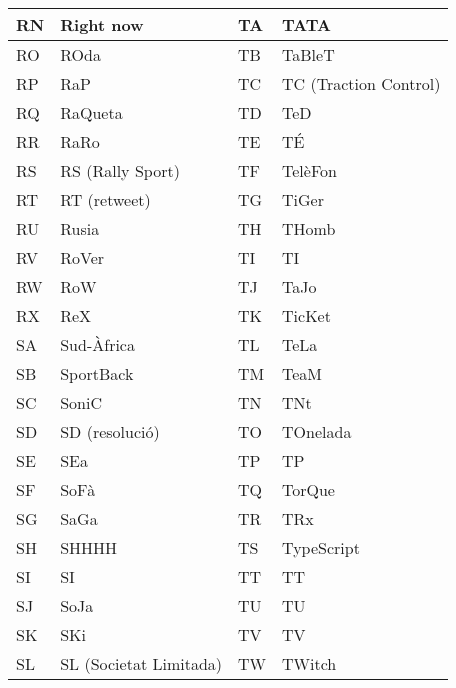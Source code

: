 \begin{table}[!ht]
    \centering
    \begin{tabular}{|l|l|l|l|}
    \hline
    RN & Right now              & TA & TATA                  \\ \hline
    RO & ROda                   & TB & TaBleT                \\ \hline
    RP & RaP                    & TC & TC (Traction Control) \\ \hline
    RQ & RaQueta                & TD & TeD                   \\ \hline
    RR & RaRo                   & TE & TÉ                    \\ \hline
    RS & RS (Rally Sport)       & TF & TelèFon               \\ \hline
    RT & RT (retweet)           & TG & TiGer                 \\ \hline
    RU & Rusia                  & TH & THomb                 \\ \hline
    RV & RoVer                  & TI & TI                    \\ \hline
    RW & RoW                    & TJ & TaJo                  \\ \hline
    RX & ReX                    & TK & TicKet                \\ \hline
    SA & Sud-Àfrica             & TL & TeLa                  \\ \hline
    SB & SportBack              & TM & TeaM                  \\ \hline
    SC & SoniC                  & TN & TNt                   \\ \hline
    SD & SD (resolució)         & TO & TOnelada              \\ \hline
    SE & SEa                    & TP & TP                    \\ \hline
    SF & SoFà                   & TQ & TorQue                \\ \hline
    SG & SaGa                   & TR & TRx                   \\ \hline
    SH & SHHHH                  & TS & TypeScript            \\ \hline
    SI & SI                     & TT & TT                    \\ \hline
    SJ & SoJa                   & TU & TU                    \\ \hline
    SK & SKi                    & TV & TV                    \\ \hline
    SL & SL (Societat Limitada) & TW & TWitch                \\ \hline

\end{tabular}
\end{table}
